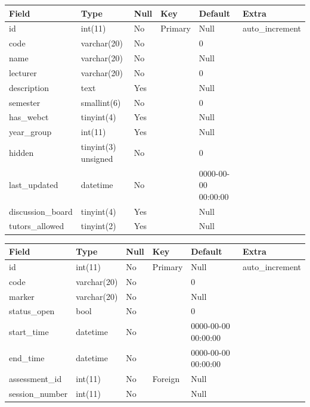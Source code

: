 \documentclass[12pt]{article}
\begin{document}
				
					\begin{tabular}{|p{1.0in}|p{0.9in}|p{0.5in}|p{0.4in}|p{1.0in}|p{1.1in}|} \hline
					Field & Type & Null & Key & Default & Extra \\ \hline
					id & int(11) & No & Primary & Null & auto\_increment \\ \hline
					code & varchar(20) & No &  & 0 &  \\ \hline
					name & varchar(20) & No &  & Null &  \\ \hline
					lecturer  & varchar(20) & No &  & 0 &  \\ \hline
					description & text & Yes &  & Null &  \\ \hline
					semester & smallint(6) & No &  & 0 &  \\ \hline
					has\_webct & tinyint(4) & Yes &  & Null &  \\ \hline
					year\_group & int(11) & Yes &  & Null &  \\ \hline
					hidden & tinyint(3) unsigned & No &  & 0 &  \\ \hline
					last\_updated & datetime & No &  & 0000-00-00 00:00:00 &  \\ \hline
					discussion\_board & tinyint(4) & Yes &  & Null &  \\ \hline
					tutors\_allowed & tinyint(2) & Yes &  & Null &  \\
					\hline
					\end{tabular}



					\begin{tabular}{|p{1.0in}|p{0.9in}|p{0.5in}|p{0.4in}|p{1.0in}|p{1.1in}|} \hline
					Field & Type & Null & Key & Default & Extra \\ \hline
					id & int(11) & No & Primary & Null & auto\_increment \\ \hline
					code & varchar(20) & No &  & 0 &  \\ \hline
					marker & varchar(20) & No &  & Null &  \\ \hline
					status\_open & bool & No &  & 0 &  \\ \hline
					start\_time & datetime & No &  & 0000-00-00 00:00:00 &  \\ \hline
					end\_time & datetime & No &  & 0000-00-00 00:00:00 &  \\ \hline
					assessment\_id & int(11) & No & Foreign & Null &  \\ \hline
					session\_number & int(11) & No &  & Null &  \\ \hline
					\end{tabular}
					
\end{document}
